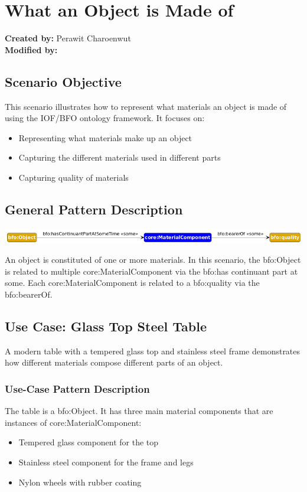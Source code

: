 \section{What an Object is Made of}
\label{chapter-scenario-template}

\textbf{Created by:} Perawit Charoenwut \\
\textbf{Modified by:}

\subsection*{Scenario Objective}
This scenario illustrates how to represent what materials an object is made of using the IOF/BFO ontology framework. It focuses on:

\begin{itemize}
    \item Representing what materials make up an object
    \item Capturing the different materials used in different parts
    \item Capturing quality of materials

\end{itemize}


\subsection*{General Pattern Description}

\includegraphics[scale=0.5]{scenarios/object-artifact-material/image/what-is-made-of-schema.png}

An object is constituted of one or more materials. In this scenario, the bfo:Object is related to multiple core:MaterialComponent via the bfo:has continuant part at some. Each core:MaterialComponent is related to a bfo:quality via the bfo:bearerOf.


\subsection*{Use Case: Glass Top Steel Table}
A modern table with a tempered glass top and stainless steel frame demonstrates how different materials compose different parts of an object.

\subsubsection*{Use-Case Pattern Description}
The table is a bfo:Object. It has three main material components that are instances of core:MaterialComponent: 
\begin{itemize}
    \item Tempered glass component for the top
    \item Stainless steel component for the frame and legs
    \item Nylon wheels with rubber coating
\end{itemize}

